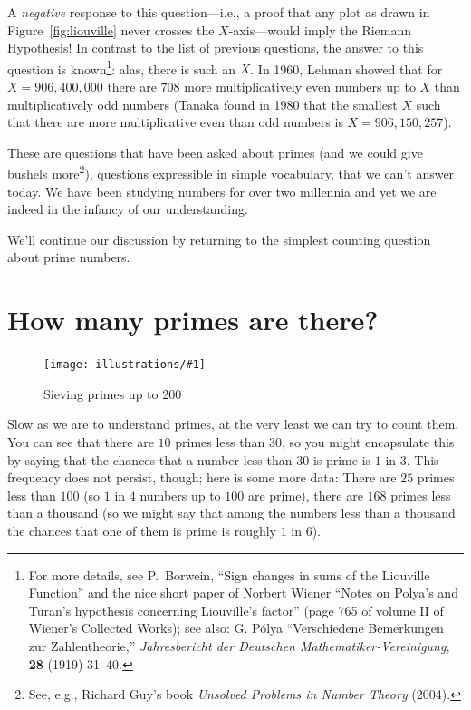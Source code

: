 \documentclass[openany]{book}
\newcommand{\ill}[3]{%
   \begin{figure}[H]%
   \vspace{-2ex}
   \centering%
   \texttt{[image: illustrations/\#1]}%
   \caption{#3}%
   \vspace{-2ex}
    \end{figure}}
\theoremstyle{plain}
\theoremstyle{definition}
\begin{document}
A {\em negative} response to this question---i.e., a proof that any
plot as drawn in Figure~\ref{fig:liouville} never crosses
the $X$-axis---would imply the Riemann Hypothesis!  In contrast to the list of
previous questions, the answer to this question is known\footnote{For more
  details, see P.~Borwein, ``Sign changes in sums of the Liouville
    Function'' and the nice short paper of Norbert Wiener ``Notes on
    Polya's and Turan's hypothesis concerning Liouville's factor''
  (page 765 of volume II of Wiener's Collected Works); see also:
  G. P\'{o}lya ``Verschiedene Bemerkungen zur Zahlentheorie,''
  {\em Jahresbericht der Deutschen Mathematiker-Vereinigung},
  {\bf 28} (1919)
  31--40.}: alas, there is such an $X$.  In 1960, Lehman showed that
for $X=906{,}400{,}000$ there are $708$ more multiplicatively even numbers
up to $X$ than multiplicatively odd numbers (Tanaka found in 1980 that
the smallest $X$ such that there are more multiplicative even than odd
numbers is $X=906{,}150{,}257$).

These are questions that have been asked about primes (and we could
give bushels more\footnote{See, e.g., Richard Guy's book {\em Unsolved Problems in Number Theory} (2004).}),
questions expressible in simple vocabulary, that
we can't answer today. We have been studying numbers for over two
millennia and yet we are indeed in the infancy of our understanding.


We'll continue our discussion by returning to the simplest counting
question about prime numbers.

\chapter{How many primes are there?}

\ill{sieve200}{.8}{Sieving primes up to 200}

Slow as we are to understand primes, at the very least we can try to
count them. You can see that there are $10$ primes less than $30$, so
you might encapsulate this by saying that the chances that a number
less than $30$ is prime is $1$ in $3$.  This frequency does not
persist, though; here is some more data: There are $25$ primes less
than $100$ (so $1$ in $4$ numbers up to $100$ are prime), there are
$168$ primes less than a thousand (so we might say that among the
numbers less than a thousand the chances that one of them is prime is
roughly $1$ in $6$).
\end{document}
